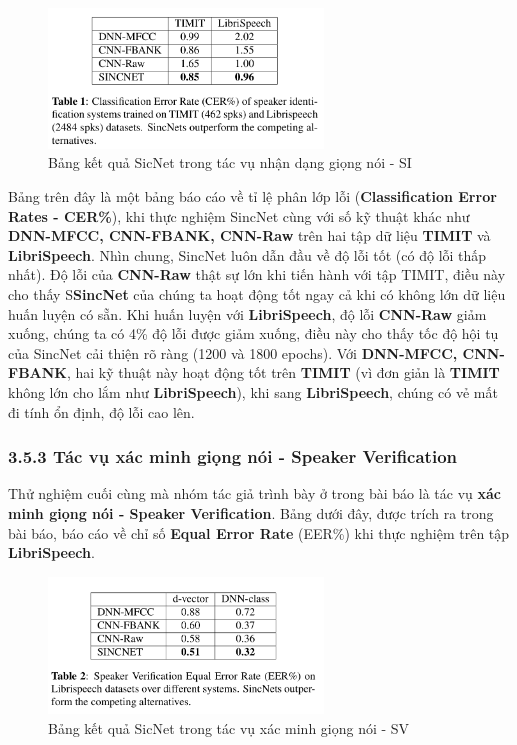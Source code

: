 \documentclass{article}
\begin{document}
	\begin{figure}[H]
		\centering
		\includegraphics[width=0.65\textwidth]{images/performance_speaker_identification.png}
		\caption{Bảng kết quả SicNet trong tác vụ nhận dạng giọng nói - SI}
		\label{fig:writing-thesis}
	\end{figure}
	Bảng trên đây là một bảng báo cáo về tỉ lệ phân lớp lỗi (\textbf{Classification Error Rates - CER\%}), khi thực nghiệm SincNet cùng với số kỹ thuật khác như \textbf{DNN-MFCC, CNN-FBANK, CNN-Raw} trên hai tập dữ liệu \textbf{TIMIT} và \textbf{LibriSpeech}. Nhìn chung, SincNet luôn dẫn đầu về độ lỗi tốt (có độ lỗi thấp nhất). Độ lỗi của \textbf{CNN-Raw} thật sự lớn khi tiến hành với tập TIMIT, điều này cho thấy S\textbf{SincNet} của chúng ta hoạt động tốt ngay cả khi có không lớn dữ liệu huấn luyện có sẵn. Khi huấn luyện với \textbf{LibriSpeech}, độ lỗi \textbf{CNN-Raw} giảm xuống, chúng ta có 4\% độ lỗi được giảm xuống, điều này cho thấy tốc độ hội tụ của SincNet cải thiện rõ ràng (1200 và 1800 epochs). Với \textbf{DNN-MFCC, CNN-FBANK}, hai kỹ thuật này hoạt động tốt trên \textbf{TIMIT} (vì đơn giản là \textbf{TIMIT} không lớn cho lắm như \textbf{LibriSpeech}), khi sang \textbf{LibriSpeech}, chúng có vẻ mất đi tính ổn định, độ lỗi cao lên.
	
	\subsubsection{3.5.3 Tác vụ xác minh giọng nói - Speaker Verification}
	Thử nghiệm cuối cùng mà nhóm tác giả trình bày ở trong bài báo là tác vụ \textbf{xác minh giọng nói - Speaker Verification}. Bảng dưới đây, được trích ra trong bài báo, báo cáo về chỉ số \textbf{Equal Error Rate} (EER\%) khi thực nghiệm trên tập \textbf{LibriSpeech}. 
	\begin{figure}[H]
		\centering
		\includegraphics[width=0.65\textwidth]{images/performance_speaker_verification.png}
		\caption{Bảng kết quả SicNet trong tác vụ xác minh giọng nói - SV}
		\label{fig:writing-thesis}
	\end{figure}
\end{document}
